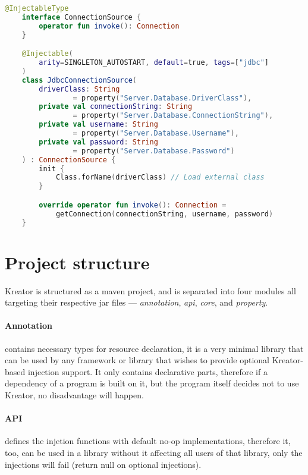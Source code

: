 		\begin{center}
			\begin{minipage}{13.5cm}
		\begin{lstlisting}[language=Kotlin, title={\emph{Example usage} --- \code{dbConnection.kt}}]
	@InjectableType
	interface ConnectionSource {
		operator fun invoke(): Connection
	}

	@Injectable(
		arity=SINGLETON_AUTOSTART, default=true, tags=["jdbc"]
	)
	class JdbcConnectionSource(
		driverClass: String
				= property("Server.Database.DriverClass"),
        private val connectionString: String
        		= property("Server.Database.ConnectionString"),
        private val username: String
        		= property("Server.Database.Username"),
        private val password: String
        		= property("Server.Database.Password")
	) : ConnectionSource {
		init {
	        Class.forName(driverClass) // Load external class
	    }

	    override operator fun invoke(): Connection =
	    	getConnection(connectionString, username, password)
	}
		\end{lstlisting}
			\end{minipage}
		\end{center}
	
	\section{Project structure}
	
	Kreator is structured as a maven project, and is separated into four modules all targeting their respective jar files --- \emph{annotation}, \emph{api}, \emph{core}, and \emph{property}.
	
	\paragraph{Annotation} contains necessary types for resource declaration, it is a very minimal library that can be used by any framework or library that wishes to provide optional Kreator-based injection support. It only contains declarative parts, therefore if a dependency of a program is built on it, but the program itself decides not to use Kreator, no disadvantage will happen.
	
	\paragraph{API} defines the injetion functions with default no-op implementations, therefore it, too, can be used in a library without it affecting all users of that library, only the injections will fail (return null on optional injections).
	

